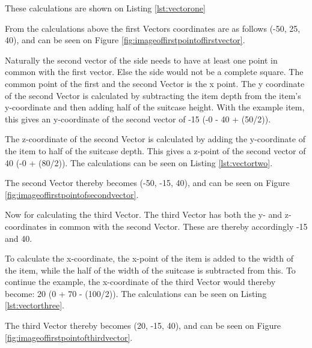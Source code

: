 These calculations are shown on Listing \ref{lst:vectorone}


From the calculations above the first Vectors coordinates are as follows (-50, 25, 40), and can be seen on Figure  \ref{fig:imageoffirstpointoffirstvector}.

Naturally the second vector of the side needs to have at least one point in common with the first vector. Else the side would not be a complete square. 
The common point of the first and the second Vector is the x point. 
The y coordinate of the second Vector is calculated by subtracting the item depth from the item's y-coordinate and then adding half of the suitcase height. With the example item, this gives an y-coordinate of the second vector of -15 (-0 - 40 + (50/2)).

The z-coordinate of the second Vector is calculated by adding the y-coordinate of the item to half of the suitcase depth. This gives a z-point of the second vector of 40 (-0 + (80/2)). The calculations can be seen on Listing \ref{lst:vectortwo}.


The second Vector thereby becomes (-50, -15, 40), and can be seen on Figure \ref{fig:imageoffirstpointofsecondvector}.

Now for calculating the third Vector. The third Vector has both the y- and z- coordinates in common with the second Vector. These are thereby accordingly -15 and 40. 

To calculate the x-coordinate, the x-point of the item is added to the width of the item, while the half of the width of the suitcase is subtracted from this. To continue the example, the x-coordinate of the third Vector would thereby become: 20 (0 + 70 - (100/2)). The calculations can be seen on Listing \ref{lst:vectorthree}.


The third Vector thereby becomes (20, -15, 40), and can be seen on Figure \ref{fig:imageoffirstpointofthirdvector}.



